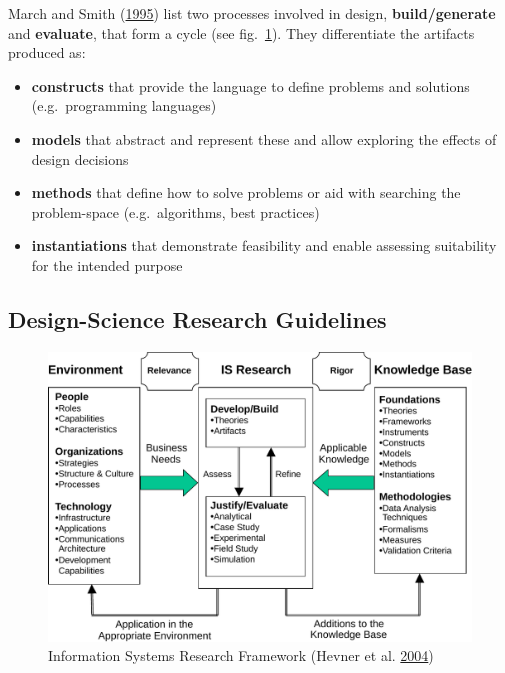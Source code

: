 \documentclass[a4paper,,tablecaptionabove]{scrbook}
\providecommand{\tightlist}{%
  \setlength{\itemsep}{0pt}\setlength{\parskip}{0pt}}
\begin{document}
March and Smith
(\protect\hyperlink{ref-MarchDesignnaturalscience1995}{1995}) list two
processes involved in design, \textbf{build/generate} and
\textbf{evaluate}, that form a cycle (see fig.~\ref{fig:hevner}). They
differentiate the artifacts produced as:

\begin{itemize}
\tightlist
\item
  \textbf{constructs} that provide the language to define problems and
  solutions (e.g.~programming languages)
\item
  \textbf{models} that abstract and represent these and allow exploring
  the effects of design decisions
\item
  \textbf{methods} that define how to solve problems or aid with
  searching the problem-space (e.g.~algorithms, best practices)
\item
  \textbf{instantiations} that demonstrate feasibility and enable
  assessing suitability for the intended purpose
\end{itemize}

\hypertarget{design-science-research-guidelines}{%
\subsection{Design-Science Research
Guidelines}\label{design-science-research-guidelines}}

\begin{figure}
\hypertarget{fig:hevner}{%
\centering
\includegraphics{./tex2pdf.11982/0e279f260acba9d3b2d9a4874e160018fa2df799.pdf}
\caption{Information Systems Research Framework (Hevner et al.
\protect\hyperlink{ref-HevnerDesignScienceInformation2004}{2004})}\label{fig:hevner}
}
\end{figure}
\end{document}
